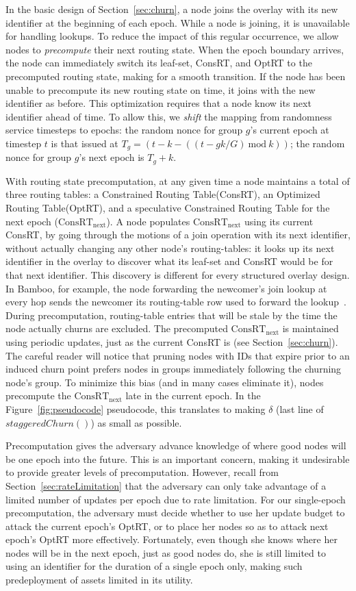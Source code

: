 \documentclass[10pt,twocolumn]{article}
\newcommand{\PRT}{OptRT\xspace}
\newcommand{\fullPRT}{Optimized Routing Table\xspace}
\newcommand{\CRT}{ConsRT\xspace}
\newcommand{\fullCRT}{Constrained Routing Table\xspace}
\newcommand{\CRTNext}{$\mathrm{\CRT}_{\mbox{next}}$\xspace}
\begin{document}
In the basic design of Section~\ref{sec:churn}, a node joins the overlay
with its new identifier at the beginning of each epoch.  While a node
is joining, it is unavailable for handling lookups.  To reduce the
impact of this regular occurrence, we allow nodes to \emph{precompute}
their next routing state.  When the epoch
boundary arrives, the node can immediately switch its leaf-set, \CRT, and \PRT
to the precomputed routing state, making for a smooth transition.  If
the node has been unable to precompute its new routing
state on time, it joins with the new identifier as before.
This optimization requires that a
node know its next identifier ahead of time.  To
allow this, we \emph{shift} the mapping from randomness service timesteps to
epochs:  the random nonce for group $g$'s current epoch at
timestep $t$ is that issued at $T_g = (t - k - ((t - gk/G) \mathrm{\ mod\ }
k))$; the random nonce for group $g$'s next epoch is 
$T_g + k$.

With routing state precomputation, at any given time a node maintains a
total of three routing
tables: a \fullCRT (\CRT), an \fullPRT (\PRT), and a speculative \fullCRT for the
next epoch (\CRTNext).
A node populates \CRTNext using its current
\CRT, by going through the motions of a join operation with its next identifier,
without actually changing any other node's routing-tables: it looks up
its next identifier in the overlay to discover what
its leaf-set and \CRT would be for that next
identifier.  This discovery is different for every structured overlay design.  In
Bamboo, for example, the node forwarding the newcomer's join lookup at every hop
sends the newcomer its routing-table row used to forward the lookup~\cite{Rhea2004}.
During precomputation, routing-table entries that will be stale by the time the node 
actually churns are excluded.  The precomputed \CRTNext is maintained using
periodic updates, just as the current \CRT is (see Section~\ref{sec:churn}). The careful
reader will notice that pruning nodes with IDs that expire prior to an induced churn point 
prefers nodes in groups immediately following the churning node's group. To minimize this bias 
(and in many cases eliminate it), nodes precompute the \CRTNext late in the current epoch. 
In the Figure~\ref{fig:pseudocode} pseudocode, this translates to making $\delta$ 
(last line of $staggeredChurn()$) as small as possible. 

Precomputation gives the adversary advance knowledge of 
where good nodes will be one epoch into the future.  This is an
important concern, making it undesirable to provide greater levels of
precomputation.  However, recall from
Section~\ref{sec:rateLimitation} that the adversary can only take
advantage of a
limited number of updates per epoch due to rate limitation.  For our single-epoch precomputation, the
adversary must decide whether to use her update budget to attack the
current epoch's \PRT, or to place her nodes so as to attack next epoch's
\PRT more effectively. Fortunately, even though she knows where her
nodes will be in the next epoch, just as good nodes do, she is still
limited to using an identifier for the duration of a single epoch only,
making such predeployment of assets limited in its utility.
\end{document}
